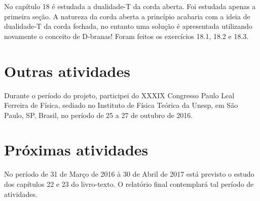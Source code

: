\documentclass[oneside, 12pt]{article}
\begin{document}
No capítulo 18 é estudada a dualidade-T da corda aberta. Foi estudada apenas a primeira seção. A natureza da corda aberta a princípio acabaria com a ideia de dualidade-T da corda fechada, no entanto uma solução é apresentada utilizando novamente o conceito de D-branas! Foram feitos os exercícios 18.1, 18.2 e 18.3.\par



\section{Outras atividades}

Durante o período do projeto, participei do XXXIX Congresso Paulo Leal Ferreira de Física, sediado no Instituto de Física Teórica da Unesp, em São Paulo, SP, Brasil, no período de 25 a 27 de outubro de 2016.\par 

\section{Próximas atividades}
No período de 31 de Março de 2016 à 30 de Abril de 2017 está previsto o estudo dos capítulos 22 e 23 do livro-texto. O relatório final contemplará tal período de atividades.\par 




\nocite{*}
\printbibliography[title={\texorpdfstring{\textsc{\textbf{Referências}}}{Referências}}] 
\end{document}
